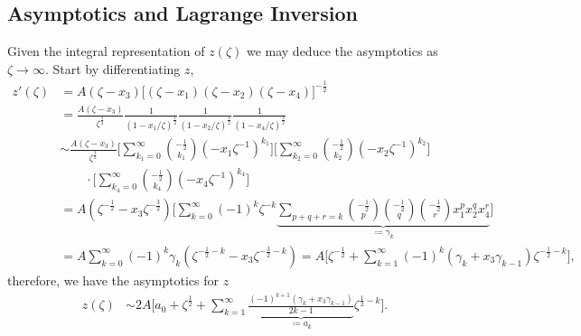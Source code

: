 \documentclass[10pt]{article}
\theoremstyle{plain}
\theoremstyle{definition}
\theoremstyle{plain}
\begin{document}
\subsection{Asymptotics and Lagrange Inversion}\label{bosonanalysis}

Given the integral representation of $z(\zeta)$ we may deduce the asymptotics as $\zeta\to\infty$. Start by differentiating $z$,
\begin{align*}
	z'(\zeta) &= A(\zeta -x_3)\big[(\zeta-x_1)(\zeta-x_2)(\zeta-x_4)\big]^{-\frac{1}{2}} \nonumber\\
	&= \frac{A(\zeta-x_3)}{\zeta^{\frac{3}{2}}}\frac{1}{(1-x_1/\zeta)^{\frac{1}{2}}}\frac{1}{(1-x_2/\zeta)^{\frac{1}{2}}}\frac{1}{(1-x_4/\zeta)^{\frac{1}{2}}} \nonumber\\
	&\sim \frac{A(\zeta-x_3)}{\zeta^{\frac{3}{2}}}\bigg[ \sum_{k_1=0}^\infty {-\frac{1}{2} \choose k_1} (-x_1\zeta^{-1})^{k_1} \bigg]\bigg[ \sum_{k_2=0}^\infty {-\frac{1}{2} \choose k_2} (-x_2\zeta^{-1})^{k_2} \bigg]\nonumber\\&\qquad \cdot\bigg[ \sum_{k_4=0}^\infty {-\frac{1}{2} \choose k_4} (-x_4\zeta^{-1})^{k_4} \bigg]\nonumber \\
	&= A(\zeta^{-\frac{1}{2}}-x_3\zeta^{-\frac{3}{2}})\bigg[  \sum_{k=0}^\infty (-1)^k \zeta^{-k}\underbrace{\sum_{p+q+r = k} {-\frac{1}{2} \choose p}{-\frac{1}{2} \choose q}{-\frac{1}{2} \choose r} x_1^px_2^qx_4^r}_{\coloneqq \gamma_k}\bigg] \nonumber\\
	&= A\sum_{k=0}^\infty (-1)^k \gamma_k (\zeta^{-\frac{1}{2}-k}-x_3\zeta^{-\frac{3}{2}-k}) = A\bigg[ \zeta^{-\frac{1}{2}} + \sum_{k=1}^\infty (-1)^{k} (\gamma_{k}+x_3\gamma_{k-1})\zeta^{-\frac{1}{2}-k} \bigg],
\end{align*}
therefore, we have the asymptotics for $z$
\begin{align}
	z(\zeta)&\sim 2A \bigg[a_0 +  \zeta^{\frac{1}{2}} + \sum_{k=1}^\infty \underbrace{ \frac{(-1)^{k+1}(\gamma_k + x_3\gamma_{k-1}) }{2k-1}}_{\coloneqq a_k} \zeta^{\frac{1}{2}-k}\bigg]. \label{integral expansion}
\end{align}
\end{document}
